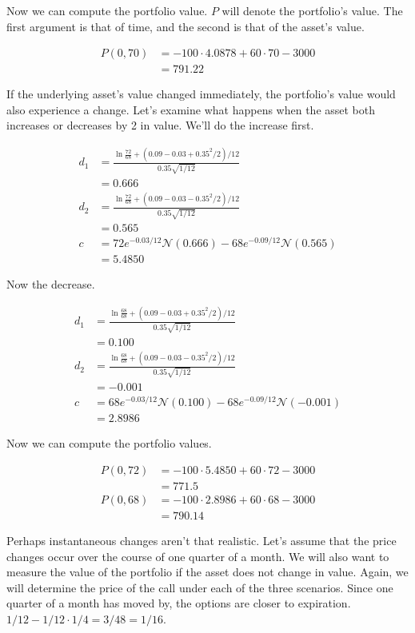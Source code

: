 \documentclass{ximera}
\begin{document}
Now we can compute the portfolio value. $P$ will denote the portfolio's value. The first argument is that of time, and the second is that of the asset's value.

\begin{align*}
P(0,70) 	&=-100\cdot 4.0878+60\cdot 70-3000\\
		&=791.22
\end{align*}

If the underlying asset's value changed immediately, the portfolio's value would also experience a change. Let's examine what happens when the asset both increases or decreases by 2 in value. We'll do the increase first.

\begin{align*}
d_1 		&=\frac{\ln\frac{72}{68}+(0.09-0.03+0.35^2/2)/12}{0.35\sqrt{1/12}}\\
		&=0.666\\
d_2 		&=\frac{\ln\frac{72}{68}+(0.09-0.03-0.35^2/2)/12}{0.35\sqrt{1/12}}\\
		&=0.565\\
c 		&=72e^{-0.03/12}\mathcal{N}(0.666)-68e^{-0.09/12}\mathcal{N}(0.565)\\
		&=5.4850
\end{align*}

Now the decrease.

\begin{align*}
d_1 		&=\frac{\ln\frac{68}{68}+(0.09-0.03+0.35^2/2)/12}{0.35\sqrt{1/12}}\\
		&=0.100\\
d_2 		&=\frac{\ln\frac{68}{68}+(0.09-0.03-0.35^2/2)/12}{0.35\sqrt{1/12}}\\
		&=-0.001\\
c 		&=68e^{-0.03/12}\mathcal{N}(0.100)-68e^{-0.09/12}\mathcal{N}(-0.001)\\
		&=2.8986
\end{align*}

Now we can compute the portfolio values.

\begin{align*}
P(0,72) 	&=-100\cdot 5.4850+60\cdot 72-3000\\
		&=771.5\\
P(0,68) 	&=-100\cdot 2.8986+60\cdot 68-3000\\
		&=790.14
\end{align*}

Perhaps instantaneous changes aren't that realistic. Let's assume that the price changes occur over the course of one quarter of a month. We will also want to measure the value of the portfolio if the asset does not change in value. Again, we will determine the price of the call under each of the three scenarios. Since one quarter of a month has moved by, the options are closer to expiration. $1/12-1/12\cdot 1/4=3/48=1/16$.
\end{document}
